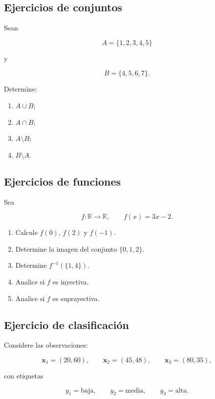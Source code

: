 \documentclass[
  spanish,
  11pt,
  letterpaper,
  DIV=11,
  numbers=noendperiod]{scrreprt}
\providecommand{\tightlist}{%
  \setlength{\itemsep}{0pt}\setlength{\parskip}{0pt}}
\theoremstyle{definition}
\theoremstyle{plain}
\theoremstyle{definition}
\theoremstyle{remark}
\begin{document}
\subsection{Ejercicios de conjuntos}\label{ejercicios-de-conjuntos}

Sean

\[
A=\{1,2,3,4,5\}
\]

y

\[
B=\{4,5,6,7\}.
\]

Determine:

\begin{enumerate}
\def\labelenumi{\arabic{enumi}.}
\tightlist
\item
  \(A\cup B\);
\item
  \(A\cap B\);
\item
  \(A\setminus B\);
\item
  \(B\setminus A\).
\end{enumerate}

\subsection{Ejercicios de funciones}\label{ejercicios-de-funciones}

Sea

\[
f:\mathbb{R}\to\mathbb{R},
\qquad
f(x)=3x-2.
\]

\begin{enumerate}
\def\labelenumi{\arabic{enumi}.}
\tightlist
\item
  Calcule \(f(0)\), \(f(2)\) y \(f(-1)\).
\item
  Determine la imagen del conjunto \(\{0,1,2\}\).
\item
  Determine \(f^{-1}(\{1,4\})\).
\item
  Analice si \(f\) es inyectiva.
\item
  Analice si \(f\) es suprayectiva.
\end{enumerate}

\subsection{Ejercicio de
clasificación}\label{ejercicio-de-clasificaciuxf3n}

Considere las observaciones:

\[
\mathbf{x}_1=(20,60),
\qquad
\mathbf{x}_2=(45,48),
\qquad
\mathbf{x}_3=(80,35),
\]

con etiquetas

\[
y_1=\text{baja},
\qquad
y_2=\text{media},
\qquad
y_3=\text{alta}.
\]
\end{document}
